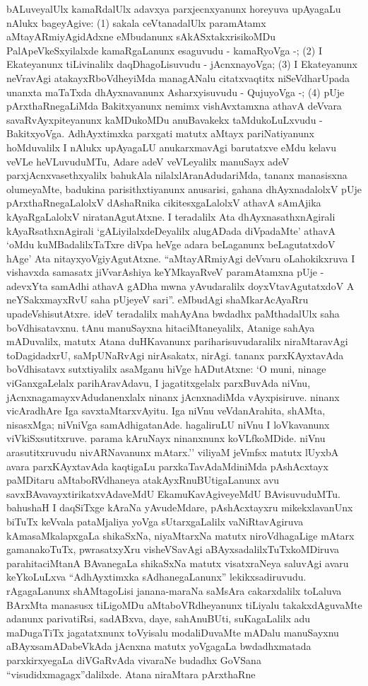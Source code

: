 bALuveyalUlx kamaRdalUlx adavxya parxjecnxyanunx horeyuva upAyagaLu nAlukx bageyAgive: {\rm(1)} sakala ceVtanadalUlx paramAtamx aMtayARmiyAgidAdxne eMbudanunx sAkASxtakxrisikoMDu PalApeVkeSxyilalxde kamaRgaLanunx esaguvudu - kamaRyoVga -; {\rm(2)} I Ekateyanunx tiLivinalilx daqDhagoLisuvudu - jAcnxnayoVga; {\rm(3)} I Ekateyanunx neVravAgi atakayxRboVdheyiMda managANalu citatxvaqtitx niSeVdharUpada unanxta maTaTxda dhAyxnavanunx Asharxyisuvudu - QujuyoVga -; {\rm(4)} pUje pArxthaRnegaLiMda Bakitxyanunx nemimx vishAvxtamxna athavA deVvara savaRvAyxpiteyanunx kaMDukoMDu anuBavakekx taMdukoLuLxvudu - BakitxyoVga. AdhAyxtimxka parxgati matutx aMtayx pariNatiyanunx hoMduvalilx I nAlukx upAyagaLU anukarxmavAgi barutatxve eMdu kelavu veVLe heVLuvuduMTu, Adare adeV veVLeyalilx manuSayx adeV parxjAcnxvasethxyalilx bahukAla nilalxlAranAdudariMda, tananx manasisxna olumeyaMte, badukina parisithxtiyanunx anusarisi, gahana dhAyxnadalolxV pUje pArxthaRnegaLalolxV dAshaRnika cikitesxgaLalolxV athavA sAmAjika kAyaRgaLalolxV niratanAgutAtxne. I teradalilx Ata dhAyxnasathxnAgirali kAyaRsathxnAgirali `gALiyilalxdeDeyalilx alugADada diVpadaMte' athavA `oMdu kuMBadalilxTaTxre diVpa heVge adara beLaganunx beLagutatxdoV hAge' Ata nitayxyoVgiyAgutAtxne. ``aMtayARmiyAgi deVvaru oLahokikxruva I vishavxda samasatx jiVvarAshiya keYMkayaRveV paramAtamxna pUje - adevxYta samAdhi athavA gADha mwna yAvudaralilx doyxVtavAgutatxdoV A neYSakxmayxRvU saha pUjeyeV sari''. eMbudAgi shaMkarAcAyaRru upadeVshisutAtxre. ideV teradalilx mahAyAna bwdadhx paMthadalUlx saha boVdhisatavxnu. tAnu manuSayxna hitaciMtaneyalilx, Atanige sahAya mADuvalilx, matutx Atana duHKavanunx pariharisuvudaralilx niraMtaravAgi toDagidadxrU, saMpUNaRvAgi nirAsakatx, nirAgi. tananx parxKAyxtavAda boVdhisatavx sutxtiyalilx asaMganu hiVge hADutAtxne: `O muni, ninage viGanxgaLelalx parihAravAdavu, I jagatitxgelalx parxBuvAda niVnu, jAcnxnagamayxvAdudanenxlalx ninanx jAcnxnadiMda vAyxpisiruve. ninanx vicAradhAre Iga savxtaMtarxvAyitu. Iga niVnu veVdanArahita, shAMta, nisasxMga; niVniVga samAdhigatanAde. hagaliruLU niVnu I loVkavanunx viVkiSxsutitxruve. parama kAruNayx ninanxnunx koVLfkoMDide. niVnu arasutitxruvudu nivARNavanunx mAtarx.'' viliyaM jeVmfsx matutx lUyxbA avara parxKAyxtavAda kaqtigaLu parxkaTavAdaMdiniMda pAshAcxtayx paMDitaru aMtaboRVdhaneya atakAyxRnuBUtigaLanunx avu savxBAvavayxtirikatxvAdaveMdU EkamuKavAgiveyeMdU BAvisuvuduMTu. bahushaH I daqSiTxge kAraNa yAvudeMdare, pAshAcxtayxru mikekxlavanUnx biTuTx keVvala pataMjaliya yoVga sUtarxgaLalilx vaNiRtavAgiruva kAmasaMkalapxgaLa shikaSxNa, niyaMtarxNa matutx niroVdhagaLige mAtarx gamanakoTuTx, pwrasatxyXru visheVSavAgi aBAyxsadalilxTuTxkoMDiruva parahitaciMtanA BAvanegaLa shikaSxNa matutx visatxraNeya saluvAgi avaru keYkoLuLxva ``AdhAyxtimxka sAdhanegaLanunx'' lekikxsadiruvudu. rAgagaLanunx shAMtagoLisi janana-maraNa saMsAra cakarxdalilx toLaluva BArxMta manasusx tiLigoMDu aMtaboVRdheyanunx tiLiyalu takakxdAguvaMte adanunx parivatiRsi, sadABxva, daye, sahAnuBUti, suKagaLalilx adu maDugaTiTx jagatatxnunx toVyisalu modaliDuvaMte mADalu manuSayxnu aBAyxsamADabeVkAda jAcnxna matutx yoVgagaLa bwdadhxmatada parxkirxyegaLa diVGaRvAda vivaraNe budadhx GoVSana ``visudidxmagagx''dalilxde. Atana niraMtara pArxthaRne 